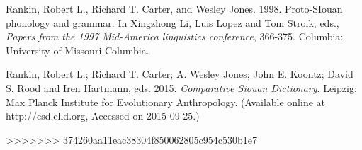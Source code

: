 \begin{refsection}
\begin{reflist}
Rankin, Robert L., Richard T. Carter, and Wesley Jones. 1998. Proto-SIouan phonology and grammar. In Xingzhong Li, Luis Lopez and Tom Stroik, eds., \textit{Papers from the 1997 Mid-America linguistics conference}, 366-375. Columbia: University of Missouri-Columbia. 

Rankin, Robert L.; Richard T. Carter; A. Wesley Jones; John E. Koontz; David S. Rood and Iren Hartmann, eds. 2015. \textit{Comparative Siouan Dictionary}. Leipzig: Max Planck Institute for Evolutionary Anthropology. (Available online at http://csd.clld.org, Accessed on 2015-09-25.) 

\end{reflist}
>>>>>>> 374260aa11eac38304f850062805c954c530b1e7
\end{refsection}

